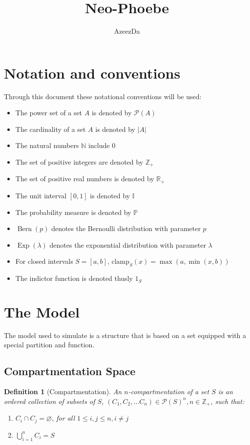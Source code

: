 \documentclass{article}
\title{Neo-Phoebe}
\author{AzeezDa}
\newtheorem{definition}{Definition}
\newcommand*{\posint}{\mathbb{Z}_+}
\newcommand*{\posreal}{\mathbb{R}_+}
\newcommand*{\uniti}{\mathbb{I}}
\newcommand*{\Prob}{\mathbb{P}}
\newcommand*{\clamp}[1]{\text{clamp}_{#1}}
\DeclareMathOperator{\Bern}{Bern}
\DeclareMathOperator{\Exp}{Exp}
\begin{document}
    \maketitle

\section*{Notation and conventions}
Through this document these notational conventions will be used:
\begin{itemize}
    \item The power set of a set \(A\) is denoted by \(\mathcal{P}(A)\)
    \item The cardinality of a set \(A\) is denoted by \(|A|\)
    \item The natural numbers \(\mathbb{N}\) include 0
    \item The set of positive integers are denoted by \(\posint\)
    \item The set of positive real numbers is denoted by \(\posreal\)
    \item The unit interval \([0,1]\) is denoted by \(\uniti\)
    \item The probability measure is denoted by \(\Prob\)
    \item \(\Bern(p)\) denotes the Bernoulli distribution with parameter \(p\)
    \item \(\Exp(\lambda)\) denotes the exponential distribution with parameter \(\lambda\)
    \item For closed intervals \(S=[a,b]\), \(\clamp{S}(x) = \max(a, \min(x, b))\)
    \item The indictor function is denoted thusly \(1_S\)
\end{itemize}

\section{The Model}\label{sec:defs}
The model used to simulate is a structure that is based on a set equipped with a special partition and function.

\subsection{Compartmentation Space}
\begin{definition}[Compartmentation]\label{def:compart}
    An \(n\)-compartmentation of a set \(S\) is an ordered collection of subsets of \(S\), \((C_1, C_2, \dots C_n) \in \mathcal{P}(S)^n, n \in \posint\), such that:
    \begin{enumerate}
        \item \(C_i \cap C_j = \varnothing\), for all \(1 \leq i,j \leq n, i \neq j\)
        \item \(\bigcup_{i=1}^n C_i = S\)
    \end{enumerate}
\end{definition}
\end{document}
